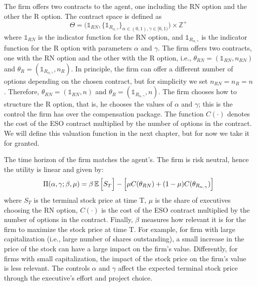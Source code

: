 The firm offers two contracts to the agent, one including the RN option and the other the R option. The contract space is defined as
$$ \Theta = \Biggl( \mathds{1}_{RN}, \bigl\{ \mathds{1}_{R_{\alpha, \gamma}} \bigr\}_{\alpha \in (0,1), \gamma \in [0, 1)} \Biggr) \times \mathbb{Z}^+ $$
where $\mathds{1}_{RN}$ is the indicator function for the RN option, and $\mathds{1}_{R_{\alpha, \gamma}}$ is the indicator function for the R option with parameters $\alpha$ and $\gamma$. The firm offers two contracts, one with the RN option and the other with the R option, i.e., $\theta_{RN} = (\mathds{1}_{RN}, n_{RN})$ and $\theta_{R} = (\mathds{1}_{R_{\alpha, \gamma}}, n_R) $. In principle, the firm can offer a different number of options depending on the chosen contract, but for simplicity we set $n_{RN} = n_R = n$. Therefore, $\theta_{RN} = (\mathds{1}_{RN}, n)$ and $\theta_{R} = (\mathds{1}_{R_{\alpha, \gamma}}, n) $. The firm chooses how to structure the R option, that is, he chooses the values of $\alpha$ and $\gamma$; this is the control the firm has over the compensation package. The function $C(\cdot)$ denotes the cost of the ESO contract multiplied by the number of options in the contract. We will define this valuation function in the next chapter, but for now we take it for granted.

The time horizon of the firm matches the agent's. The firm is risk neutral, hence the utility is linear and given by:
$$ \Pi (\alpha, \gamma; \beta, \mu) = \beta \operatorname{\mathbb{E}} \Big[ S_T \Big] - \Big[ \mu C(\theta_{RN}) + (1-\mu) C(\theta_{R_{\alpha, \gamma}}) \Big] $$
where $S_T$ is the terminal stock price at time T, $\mu$ is the share of executives choosing the RN option, $C(\cdot)$ is the cost of the ESO contract multiplied by the number of options in the contract. Finally, $\beta$ measures how relevant it is for the firm to maximize the stock price at time T. For example, for firm with large capitalization (i.e., large number of shares outstanding), a small increase in the price of the stock can have a large impact on the firm's value. Differently, for firms with small capitalization, the impact of the stock price on the firm's value is less relevant. The controls $\alpha$ and $\gamma$ affect the expected terminal stock price through the executive's effort and project choice.

